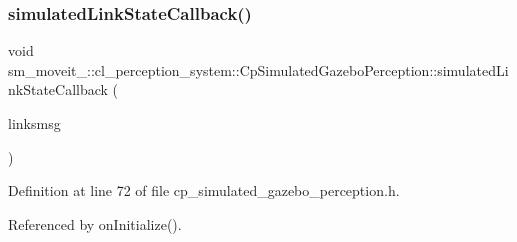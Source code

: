 \subsubsection{\texorpdfstring{simulated\+Link\+State\+Callback()}{simulatedLinkStateCallback()}}
{\footnotesize\ttfamily void sm\+\_\+moveit\+\_\+::cl\+\_\+perception\+\_\+system\+::\+Cp\+Simulated\+Gazebo\+Perception\+::simulated\+Link\+State\+Callback (\begin{DoxyParamCaption}\item[{const gazebo\+\_\+msgs\+::\+Link\+States \&}]{linksmsg }\end{DoxyParamCaption})\hspace{0.3cm}{\ttfamily [inline]}}



Definition at line 72 of file cp\+\_\+simulated\+\_\+gazebo\+\_\+perception.\+h.



Referenced by on\+Initialize().


